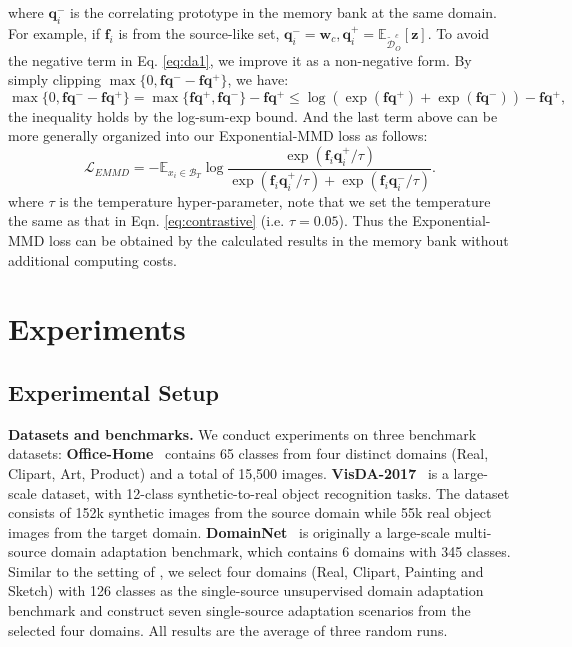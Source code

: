 \documentclass{article}
\def\vf{{\bm{f}}}
\def\vq{{\bm{q}}}
\def\vw{{\bm{w}}}
\def\vz{{\bm{z}}}
\begin{document}
where $\vq^-_i$ is the correlating prototype in the memory bank at the same domain. For example, if $\vf_i$ is from the source-like set, $\vq^-_i = \vw_c, \vq^+_i = \mathbb{E}_{\tilde{\mathcal{D}}_{O}^c}[\vz]$. To avoid the negative term in Eq. \ref{eq:da1}, we improve it as a non-negative form. By simply clipping $\max{ \{ 0, \vf\vq^- - \vf\vq^+\}}$, we have:
\begin{equation*}
\max{ \{ 0, \vf\vq^- - \vf\vq^+\}}  = \max{\{ \vf\vq^+,\vf\vq^-\}}-\vf\vq^+ 
         \leq \log\left(\exp(\vf\vq^+)+\exp(\vf\vq^-)\right) - \vf\vq^+ ,
\end{equation*}
the inequality holds by the log-sum-exp bound. And the last term above can be more generally organized into our Exponential-MMD loss as follows:
\begin{equation}\label{eq:emmd}
    \mathcal{L}_{\textit{EMMD}} = -\mathbb{E}_{x_i\in \mathcal{B}_T}  \log \frac{\exp(\vf_i\vq^+_i/\tau)}{\exp(\vf_i\vq^+_i/\tau) + \exp(\vf_i\vq^-_i/\tau)}.
\end{equation}
where $\tau$ is the temperature hyper-parameter, note that we set the temperature the same as that in Eqn. \ref{eq:contrastive} (i.e. $\tau=0.05$). Thus the Exponential-MMD loss can be obtained by the calculated results in the memory bank without additional computing costs.

\section{Experiments}
\subsection{Experimental Setup}
\textbf{Datasets and benchmarks.} We conduct experiments on three benchmark datasets: \textbf{Office-Home}~\cite{officehome2017DeepHN} contains 65 classes from four distinct domains (Real, Clipart, Art, Product) and a total of 15,500 images. \textbf{VisDA-2017}~\cite{Peng2017VisDATV} is a large-scale dataset, with 12-class synthetic-to-real object recognition tasks. The dataset consists of 152k synthetic images from the source domain while 55k real object images from the target domain. \textbf{DomainNet}~\cite{peng2019moment_domainnet} is originally a large-scale multi-source domain adaptation benchmark, which contains 6 domains with 345 classes. Similar to the setting of \cite{saito2019semidomainnet,li2021semiuda}, we select four domains (Real, Clipart, Painting and Sketch) with 126 classes as the single-source unsupervised domain adaptation benchmark and construct seven single-source adaptation scenarios from the selected four domains. All results are the average of three random runs.
\end{document}
